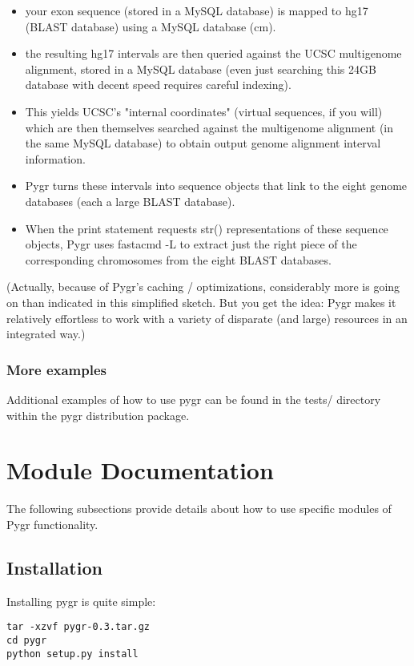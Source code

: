 \documentclass{howto}
\begin{document}
\begin{itemize}

\item
your exon sequence (stored in a MySQL database) is mapped to hg17 (BLAST database) using a MySQL database (cm). 

\item
the resulting hg17 intervals are then queried against the UCSC multigenome alignment, stored in a MySQL database (even just searching this 24GB database with decent speed requires careful indexing). 

\item
This yields UCSC's "internal coordinates" (virtual sequences, if you will) which are then themselves searched against the multigenome alignment (in the same MySQL database) to obtain output genome alignment interval information.

\item
Pygr turns these intervals into sequence objects that link to the eight genome databases (each a large BLAST database).

\item
When the print  statement requests str() representations of these sequence objects, Pygr uses fastacmd -L to extract just the right piece of the corresponding chromosomes from the eight BLAST databases.

\end{itemize}

(Actually, because of Pygr's caching / optimizations, considerably more is going on than indicated in this simplified sketch.  But you get the idea: Pygr makes it relatively effortless to work with a variety of disparate (and large) resources in an integrated way.)

	
\subsubsection{More examples}
\label{more-exam}

Additional examples of how to use pygr can be found in the tests/ directory within the pygr distribution package.


\section{Module Documentation}
\label{module-doc}

The following subsections provide details about how to use specific
modules of Pygr functionality. 

\subsection{Installation}
\label{install}
Installing pygr is quite simple:
\begin{verbatim}
tar -xzvf pygr-0.3.tar.gz 
cd pygr
python setup.py install 
\end{verbatim}
\end{document}
